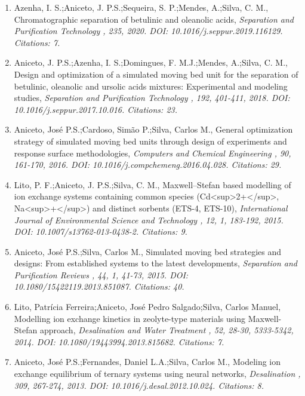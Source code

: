 \documentclass{article}
\begin{document}
\begin{enumerate}
        \item Azenha, I. S.;Aniceto, J. P.S.;Sequeira, S. P.;Mendes, A.;Silva, C. M., Chromatographic separation of betulinic and oleanolic acids, \it{ Separation and Purification Technology }, 235, 2020. DOI: 10.1016/j.seppur.2019.116129. Citations: 7. 
    
        \item Aniceto, J. P.S.;Azenha, I. S.;Domingues, F. M.J.;Mendes, A.;Silva, C. M., Design and optimization of a simulated moving bed unit for the separation of betulinic, oleanolic and ursolic acids mixtures: Experimental and modeling studies, \it{ Separation and Purification Technology }, 192, 401-411, 2018. DOI: 10.1016/j.seppur.2017.10.016. Citations: 23. 
    
        \item Aniceto, José P.S.;Cardoso, Simão P.;Silva, Carlos M., General optimization strategy of simulated moving bed units through design of experiments and response surface methodologies, \it{ Computers and Chemical Engineering }, 90, 161-170, 2016. DOI: 10.1016/j.compchemeng.2016.04.028. Citations: 29. 
    
        \item Lito, P. F.;Aniceto, J. P.S.;Silva, C. M., Maxwell–Stefan based modelling of ion exchange systems containing common species (Cd<sup>2+</sup>, Na<sup>+</sup>) and distinct sorbents (ETS-4, ETS-10), \it{ International Journal of Environmental Science and Technology }, 12, 1, 183-192, 2015. DOI: 10.1007/s13762-013-0438-2. Citations: 9. 
    
        \item Aniceto, José P.S.;Silva, Carlos M., Simulated moving bed strategies and designs: From established systems to the latest developments, \it{ Separation and Purification Reviews }, 44, 1, 41-73, 2015. DOI: 10.1080/15422119.2013.851087. Citations: 40. 
    
        \item Lito, Patrícia Ferreira;Aniceto, José Pedro Salgado;Silva, Carlos Manuel, Modelling ion exchange kinetics in zeolyte-type materials using Maxwell-Stefan approach, \it{ Desalination and Water Treatment }, 52, 28-30, 5333-5342, 2014. DOI: 10.1080/19443994.2013.815682. Citations: 7. 
    
        \item Aniceto, José P.S.;Fernandes, Daniel L.A.;Silva, Carlos M., Modeling ion exchange equilibrium of ternary systems using neural networks, \it{ Desalination }, 309, 267-274, 2013. DOI: 10.1016/j.desal.2012.10.024. Citations: 8. 
    

\end{enumerate}
\end{document}
